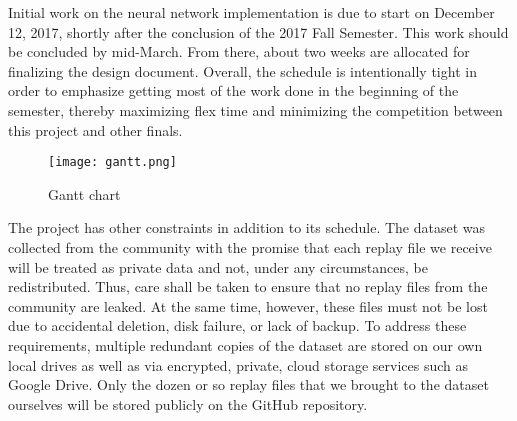 Initial work on the neural network implementation is due to start on December 12, 2017, shortly after the conclusion of the 2017 Fall Semester. This work should be concluded by mid-March. From there, about two weeks are allocated for finalizing the design document. Overall, the schedule is intentionally tight in order to emphasize getting most of the work done in the beginning of the semester, thereby maximizing flex time and minimizing the competition between this project and other finals.

\begin{figure}
	\caption{Gantt chart}
	\centering
	\texttt{[image: gantt.png]} \\
\end{figure}

The project has other constraints in addition to its schedule. The dataset was collected from the community with the promise that each replay file we receive will be treated as private data and not, under any circumstances, be redistributed. Thus, care shall be taken to ensure that no replay files from the community are leaked. At the same time, however, these files must not be lost due to accidental deletion, disk failure, or lack of backup. To address these requirements, multiple redundant copies of the dataset are stored on our own local drives as well as via encrypted, private, cloud storage services such as Google Drive. Only the dozen or so replay files that we brought to the dataset ourselves will be stored publicly on the GitHub repository.

